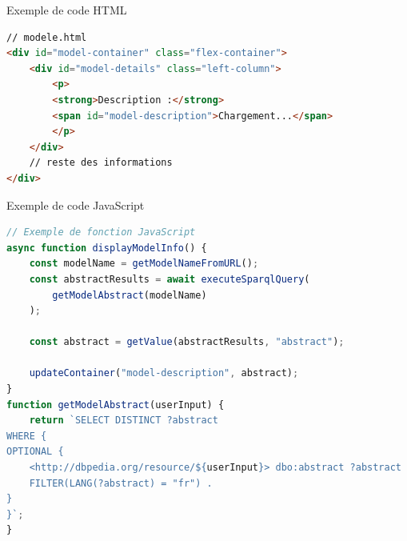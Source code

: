 \documentclass[10pt]{beamer}
\begin{document}
\begin{frame}[fragile]{Exemple de code HTML}
\begin{center}
\begin{minipage}{0.9\textwidth} %
\begin{lstlisting}[language=HTML, caption=Exemple de requête HTML]
// modele.html
<div id="model-container" class="flex-container">
    <div id="model-details" class="left-column">
        <p>
        <strong>Description :</strong>
        <span id="model-description">Chargement...</span>
        </p>
    </div>
    // reste des informations
</div>
\end{lstlisting}
\end{minipage}
\end{center}
\end{frame}

\begin{frame}[fragile]{Exemple de code JavaScript}
\begin{center}
\begin{minipage}{0.8\textwidth} %
\begin{lstlisting}[language=JavaScript, caption=Exemple de script JavaScript]
// Exemple de fonction JavaScript
async function displayModelInfo() {
    const modelName = getModelNameFromURL();
    const abstractResults = await executeSparqlQuery(
        getModelAbstract(modelName)
    );

    const abstract = getValue(abstractResults, "abstract");

    updateContainer("model-description", abstract);
}
function getModelAbstract(userInput) {
    return `SELECT DISTINCT ?abstract
WHERE {
OPTIONAL {
    <http://dbpedia.org/resource/${userInput}> dbo:abstract ?abstract .
    FILTER(LANG(?abstract) = "fr") .
} 
}`;
}
\end{lstlisting}
\end{minipage}
\end{center}
\end{frame}

\end{document}
